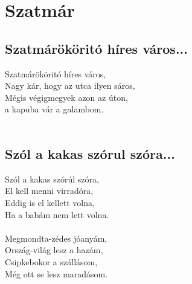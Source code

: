 \chapter{Szatmár}
\section{Szatmárököritó híres város...}
Szatmárököritó híres város,\\
Nagy kár, hogy az utca ilyen sáros,\\
Mégis végigmegyek azon az úton,\\
a kapuba vár a galambom.\\\\
\section{Szól a kakas szórul szóra...}
Szól a kakas szórúl szóra,\\
El kell menni virradóra,\\
Eddig is el kellett volna,\\
Ha a babám nem lett volna.\\\\
Megmondta-zédes jóanyám,\\
Ország-világ lesz a hazám,\\
Csipkebokor a szállásom,\\
Még ott se lesz maradásom.\\